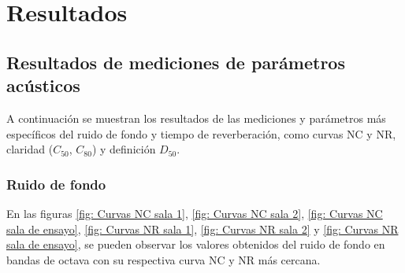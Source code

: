 \section{Resultados}
\subsection{Resultados de mediciones de parámetros acústicos}
A continuación se muestran los resultados de las mediciones y parámetros más específicos del ruido de fondo y tiempo de reverberación, como curvas NC y NR, claridad ($C_{50}$, $C_{80}$) y definición $D_{50}$.
\subsubsection{Ruido de fondo}
En las figuras \ref{fig: Curvas NC sala 1}, \ref{fig: Curvas NC sala 2}, \ref{fig: Curvas NC sala de ensayo}, \ref{fig: Curvas NR sala 1}, \ref{fig: Curvas NR sala 2} y \ref{fig: Curvas NR sala de ensayo}, se pueden observar los valores obtenidos del ruido de fondo en bandas de octava con su respectiva curva NC y NR más cercana.
